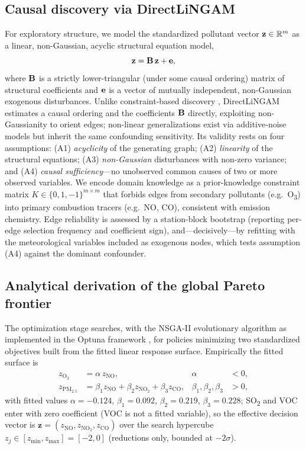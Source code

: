 \subsection{Causal discovery via DirectLiNGAM}
For exploratory structure, we model the standardized pollutant vector
$\mathbf{z}\in\mathbb{R}^{m}$ as a linear, non-Gaussian, acyclic structural equation model,
\begin{equation}
  \mathbf{z} = \mathbf{B}\,\mathbf{z} + \mathbf{e},
  \label{eq:sem}
\end{equation}
where $\mathbf{B}$ is a strictly lower-triangular (under some causal ordering) matrix of
structural coefficients and $\mathbf{e}$ is a vector of mutually independent, non-Gaussian
exogenous disturbances. Unlike constraint-based
discovery \citep{spirtes2000causation}, DirectLiNGAM
\citep{shimizu2006lingam,shimizu2011directlingam} estimates a causal ordering and the
coefficients $\mathbf{B}$ directly, exploiting non-Gaussianity to orient edges; non-linear
generalizations exist via additive-noise models \citep{hoyer2009anm} but inherit the
same confounding sensitivity. Its validity rests on four assumptions:
(A1) \emph{acyclicity} of the generating graph; (A2) \emph{linearity} of the structural
equations; (A3) \emph{non-Gaussian} disturbances with non-zero variance; and
(A4) \emph{causal sufficiency}---no unobserved common causes of two or more observed
variables. We encode domain knowledge as a prior-knowledge constraint matrix
$K\in\{0,1,{-}1\}^{m\times m}$ that forbids edges from secondary pollutants
(e.g.\ O\textsubscript{3}) into primary combustion tracers (e.g.\ NO, CO), consistent
with emission chemistry. Edge reliability is assessed by a station-block bootstrap
(reporting per-edge selection frequency and coefficient sign), and---decisively---by
refitting with the meteorological variables included as exogenous nodes, which tests
assumption (A4) against the dominant confounder.

\subsection{Analytical derivation of the global Pareto frontier}
The optimization stage searches, with the NSGA-II evolutionary algorithm
\citep{deb2002nsga2} as implemented in the Optuna framework \citep{akiba2019optuna},
for policies minimizing two standardized objectives built from the fitted linear
response surface. Empirically the fitted surface is
\begin{align}
  z_{\mathrm{O_3}}   &= \alpha\, z_{\mathrm{NO}}, & \alpha &< 0, \label{eq:resp_o3}\\
  z_{\mathrm{PM_{2.5}}} &= \beta_1 z_{\mathrm{NO}} + \beta_2 z_{\mathrm{NO_2}}
                            + \beta_3 z_{\mathrm{CO}}, & \beta_1,\beta_2,\beta_3 &> 0,
  \label{eq:resp_pm}
\end{align}
with fitted values $\alpha=-0.124$, $\beta_1=0.092$, $\beta_2=0.219$, $\beta_3=0.228$;
SO\textsubscript{2} and VOC enter with zero coefficient (VOC is not a fitted variable),
so the effective decision vector is
$\mathbf{z}=(z_{\mathrm{NO}},z_{\mathrm{NO_2}},z_{\mathrm{CO}})$ over the search
hypercube $z_j\in[z_{\min},z_{\max}]=[-2,0]$ (reductions only, bounded at $-2\sigma$).

